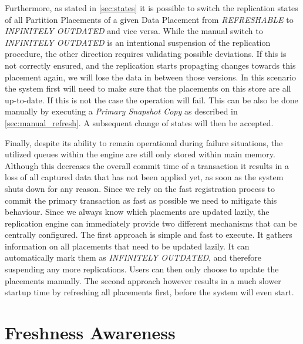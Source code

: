 Furthermore, as stated in \ref{sec:states} it is possible to switch the replication states of all Partition Placements of a given Data Placement from \emph{REFRESHABLE} to 
\emph{INFINITELY OUTDATED} and vice versa.
While the manual switch to \emph{INFINITELY OUTDATED} is an intentional suspension of the replication procedure, the other direction requires validating possible deviations.
If this is not correctly ensured, and the replication starts propagting changes towards this placement again, we will lose the data in between those versions.
In this scenario the system first will need to make sure that the placements on this store are all up-to-date. If this is not the case the operation will fail. 
This can be also be done manually by executing a \emph{Primary Snapshot Copy} as described in \ref{sec:manual_refresh}. A subsequent change of states will then be accepted.

Finally, despite its ability to remain operational during failure situations, the utilized queues within the engine are still only stored within main memory.
Although this decreases the overall commit time of a transaction it results in a loss of all captured data that has not been applied yet, as soon as the system 
shuts down for any reason. Since we rely on the fast registration process to commit the primary transaction as fast as possible we need to mitigate this behaviour.
Since we always know which placments are updated lazily, the replication engine can immediately provide two different mechanisms that can be centrally configured. 
The first approach is simple and fast to execute. It gathers information on all placements that need to be updated lazily. It can automatically mark them as 
\emph{INFINITELY OUTDATED}, 
and therefore suspending any more replications. Users can then only choose to update the placements manually.
The second approach however results in a much slower startup time by refreshing all placements first, before the system will even start.









\section{Freshness Awareness}

